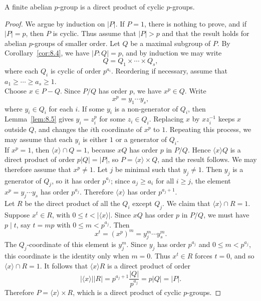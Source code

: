 \documentclass[../Odyssey_Project.tex]{subfiles}
\begin{document}
\begin{theorem}
\label{thm:8.6}
A finite abelian $p$-group is a direct product of cyclic $p$-groups.
\end{theorem}
\begin{proof}
We argue by induction on $\lvert P\rvert$. If $P=1$, there is nothing to prove, and if $\lvert P\rvert=p$, then $P$ is cyclic. Thus assume that $\lvert P\rvert>p$ and that the result holds for abelian $p$-groups of smaller order. Let $Q$ be a maximal subgroup of $P$. By Corollary~\ref{cor:8.4}, we have $\lvert P:Q\rvert=p$, and by induction we may write
\[
    Q=Q_1\times\cdots\times Q_s,
\]
where each $Q_i$ is cyclic of order $p^{a_i}$. Reordering if necessary, assume that $a_1\geq\cdots\geq a_s\geq 1$.\\
Choose $x\in P-Q$. Since $P/Q$ has order $p$, we have $x^p\in Q$. Write
\[
    x^p=y_1\cdots y_s,
\]
where $y_i\in Q_i$ for each $i$. If some $y_i$ is a non-generator of $Q_i$, then Lemma~\ref{lem:8.5} gives $y_i=z_i^p$ for some $z_i\in Q_i$. Replacing $x$ by $xz_i^{-1}$ keeps $x$ outside $Q$, and changes the $i$th coordinate of $x^p$ to $1$. Repeating this process, we may assume that each $y_i$ is either $1$ or a generator of $Q_i$.\\
If $x^p=1$, then $\langle x\rangle\cap Q=1$, because $xQ$ has order $p$ in $P/Q$. Hence $\langle x\rangle Q$ is a direct product of order $p\lvert Q\rvert=\lvert P\rvert$, so $P=\langle x\rangle\times Q$, and the result follows. We may therefore assume that $x^p\neq 1$. Let $j$ be minimal such that $y_j\neq 1$. Then $y_j$ is a generator of $Q_j$, so it has order $p^{a_j}$; since $a_j\geq a_i$ for all $i\geq j$, the element $x^p=y_j\cdots y_s$ has order $p^{a_j}$. Therefore $\langle x\rangle$ has order $p^{a_j+1}$.\\
Let $R$ be the direct product of all the $Q_i$ except $Q_j$. We claim that $\langle x\rangle\cap R=1$. Suppose $x^t\in R$, with $0\leq t<\lvert\langle x\rangle\rvert$. Since $xQ$ has order $p$ in $P/Q$, we must have $p\mid t$, say $t=mp$ with $0\leq m<p^{a_j}$. Then
\[
    x^t=(x^p)^m=y_j^m\cdots y_s^m.
\]
The $Q_j$-coordinate of this element is $y_j^m$. Since $y_j$ has order $p^{a_j}$ and $0\leq m<p^{a_j}$, this coordinate is the identity only when $m=0$. Thus $x^t\in R$ forces $t=0$, and so $\langle x\rangle\cap R=1$. It follows that $\langle x\rangle R$ is a direct product of order
\[
    \lvert\langle x\rangle\rvert\lvert R\rvert
    =p^{a_j+1}\frac{\lvert Q\rvert}{p^{a_j}}
    =p\lvert Q\rvert
    =\lvert P\rvert.
\]
Therefore $P=\langle x\rangle\times R$, which is a direct product of cyclic $p$-groups.
\end{proof}
\end{document}
